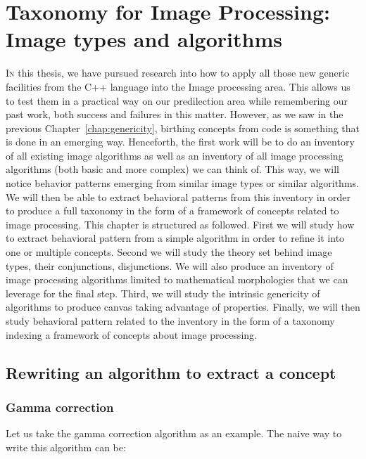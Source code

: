 \chapter{Taxonomy for Image Processing: Image types and algorithms}
\label{chap:image.algorithms.taxonomy}

\lettrine[lines=2]{I}{n} this thesis, we have pursued research into how to apply all those new generic facilities from
the C++ language into the Image processing area. This allows us to test them in a practical way on our predilection area
while remembering our past work, both success and failures in this matter. However, as we saw in the previous
Chapter~\ref{chap:genericity}, birthing concepts from code is something that is done in an emerging way. Henceforth, the
first work will be to do an inventory of all existing image algorithms as well as an inventory of all image processing
algorithms (both basic and more complex) we can think of. This way, we will notice behavior patterns emerging from
similar image types or similar algorithms. We will then be able to extract behavioral patterns from this inventory in
order to produce a full taxonomy in the form of a framework of concepts related to image processing. This chapter is
structured as followed. First we will study how to extract behavioral pattern from a simple algorithm in order to refine
it into one or multiple concepts. Second we will study the theory set behind image types, their conjunctions,
disjunctions. We will also produce an inventory of image processing algorithms limited to mathematical morphologies that
we can leverage for the final step. Third, we will study the intrinsic genericity of algorithms to produce canvas taking
advantage of properties. Finally, we will then study behavioral pattern related to the inventory in the form of a
taxonomy indexing a framework of concepts about image processing.

\section{Rewriting an algorithm to extract a concept}
\label{sec:rewriting}

\subsection{Gamma correction}
\label{subsec:gamma}

Let us take the gamma correction algorithm as an example. The naive way to write this algorithm can be:

